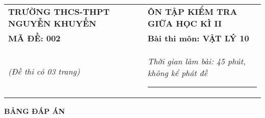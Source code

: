 \begin{center}
	\begin{tabular}{M{9.25cm}M{8.75cm}}
		\textbf{TRƯỜNG THCS-THPT NGUYỄN KHUYẾN}& \textbf{ÔN TẬP KIỂM TRA GIỮA HỌC KÌ II}\\
		\textbf{MÃ ĐỀ: 002}& \textbf{Bài thi môn: VẬT LÝ 10}\\
		\textit{(Đề thi có 03 trang)}& \textit{Thời gian làm bài: 45 phút, không kể phát đề}
		
		\noindent\rule{4cm}{0.8pt} \\
	\end{tabular}
\end{center}
\setcounter{section}{0}
\begin{center}
	\textbf{\large BẢNG ĐÁP ÁN}
\end{center}
\section{}
\section{}
